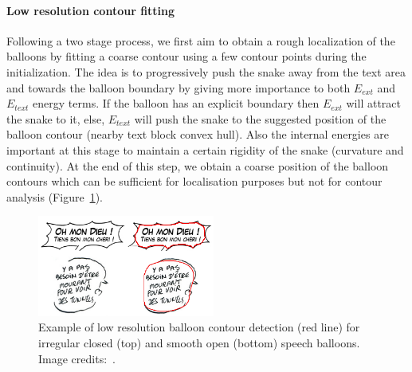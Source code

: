 
\paragraph{Low resolution contour fitting}
Following a two stage process, we first aim to obtain a rough localization of the balloons by fitting a coarse contour using a few contour points during the initialization.
The idea is to progressively push the snake away from the text area and towards the balloon boundary by giving more importance to both $E_{ext}$ and $E_{text}$ energy terms.
If the balloon has an explicit boundary then $E_{ext}$ will attract the snake to it, else, $E_{text}$ will push the snake to the suggested position of the balloon contour (nearby text block convex hull).
Also the internal energies are important at this stage to maintain a certain rigidity of the snake (curvature and continuity).
At the end of this step, we obtain a coarse position of the balloon contours which can be sufficient for localisation purposes but not for contour analysis (Figure~\ref{fig:se:mono_res_det}).

	\begin{figure}[!ht]	%
	  \centering
		\includegraphics[trim = 0mm 3mm 0mm 1mm, clip, width=220px]{mono_res_det.png}
		\caption[Examples of low resolution contour detection for balloon extraction]{Example of low resolution balloon contour detection (red line) for irregular closed (top) and smooth open (bottom) speech balloons. Image credits:~\cite{EtPisTaf12,Montaine11}.}
		\label{fig:se:mono_res_det}
	\end{figure}

